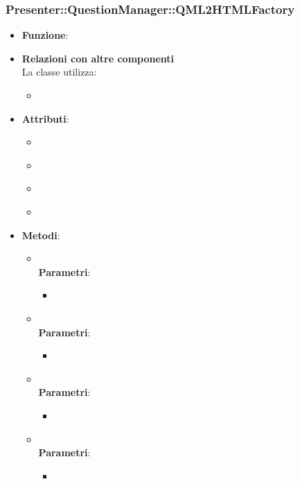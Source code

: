 \subsubsection{Presenter::QuestionManager::QML2HTMLFactory}
\begin{itemize}
\item\textbf{Funzione}:
\item\textbf{Relazioni con altre componenti}\\
La classe utilizza:
	\begin{itemize}
		\item
	\end{itemize}
\item\textbf{Attributi}:
	\begin{itemize}
		\item\code{}\\
		\item\code{}\\
		\item\code{}\\
		\item\code{}\\
	\end{itemize}
\item\textbf{Metodi}:
	\begin{itemize}
		\item\code{}\\
		\textbf{Parametri}:
			\begin{itemize}
				\item\code{}\\
			\end{itemize}
		\item\code{}\\
		\textbf{Parametri}:
			\begin{itemize}
				\item\code{}\\
			\end{itemize}
		\item\code{}\\
		\textbf{Parametri}:
			\begin{itemize}
				\item\code{}\\
			\end{itemize}
		\item\code{}\\
		\textbf{Parametri}:
			\begin{itemize}
				\item\code{}\\
			\end{itemize}
	\end{itemize}
\end{itemize}

